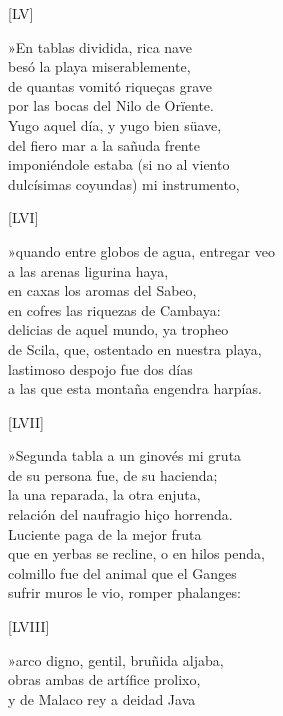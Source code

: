 \documentclass[11pt,a4paper,twoside]{article}
\newcommand{\ch}{\emph{\textsc{Ch}}}
\begin{document}
\begin{center}
	[LV]
\end{center}\pstart
»En tablas dividida, rica nave\\
besó la playa miserablemente,\\
de quantas vomitó riqueças grave\\
por las bocas del Nilo de Orïente.\\
Yugo aquel día, y yugo bien süave,\\
del fiero mar a la sañuda frente\\
imponiéndole estaba (si no al viento\\
dulcísimas coyundas) mi instrumento,\par\pend
%
\begin{center}
	[LVI]
\end{center}\pstart
»quando entre globos de agua, entregar veo\\
a las arenas ligurina haya,\\
en caxas los aromas del Sabeo,\\
en cofres las riquezas de Cambaya:\\
delicias de aquel mundo, ya tropheo\\
de Scila, que, ostentado en nuestra playa,\\
lastimoso despojo fue dos días\\
a las que esta montaña engendra harpías.\par\pend
%
\begin{center}
	[LVII]
\end{center}\pstart
»Segunda tabla a un ginovés mi gruta\\
de su persona fue, de su hacienda;\\
la una reparada, la otra enjuta,\\
relación del naufragio hiço horrenda.\\
Luciente paga de la mejor fruta\\
que en yerbas se recline, o en hilos penda,\\
colmillo fue del animal que el Ganges\\
sufrir muros le vio, romper phalanges:\par\pend
%
\begin{center}
	[LVIII]
\end{center}\pstart
»arco digno, gentil, bruñida aljaba,\\
obras ambas de artífice prolixo,\\
y de Malaco rey a deidad Java\edtext{}{\Afootnote[nosep]{laua \emph{err.} {\ch}}}\\
\end{document}
